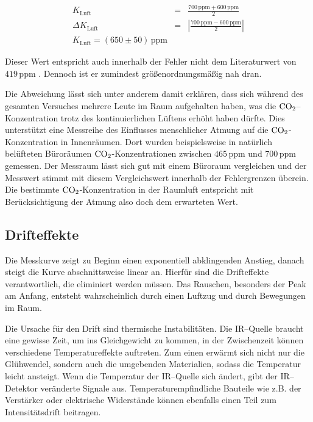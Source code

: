 \documentclass[12pt,a4paper]{scrartcl}
\numberwithin{equation}{section} %
\begin{document}
\begin{eqnarray}
  K_\mathrm{Luft} &=& \frac{700 \mathrm{\, ppm} + 600 \mathrm{\, ppm}}{2} \\
  \Delta K_\mathrm{Luft} &=& \left|\frac{700 \mathrm{\, ppm} - 600 \mathrm{\, ppm}}{2}\right| \\
  K_\mathrm{Luft} = (650 \pm 50) \mathrm{\, ppm}
\end{eqnarray}

Dieser Wert entspricht auch innerhalb der Fehler nicht dem Literaturwert von $419 \mathrm{\, ppm}$ \cite{Kohlendioxid Anteil}. Dennoch ist er zumindest größenordnungsmäßig nah dran.

Die Abweichung lässt sich unter anderem damit erklären, dass sich während des gesamten Versuches mehrere Leute im Raum aufgehalten haben, was die $\ce{CO_2}$--Konzentration trotz des kontinuierlichen Lüftens erhöht haben dürfte. Dies unterstützt eine Messreihe des Einflusses menschlicher Atmung auf die $\ce{CO_2}$-Konzentration in Innenräumen. \cite{Kohlendioxid Innenraum} Dort wurden beispielsweise in natürlich belüfteten Büroräumen $\ce{CO_2}$-Konzentrationen zwischen $465 \mathrm{\, ppm}$ und $700 \mathrm{\, ppm}$ gemessen. Der Messraum lässt sich gut mit einem Büroraum vergleichen und der Messwert stimmt mit diesem Vergleichswert innerhalb der Fehlergrenzen überein. Die bestimmte $\ce{CO_2}$-Konzentration in der Raumluft entspricht mit Berücksichtigung der Atmung also doch dem erwarteten Wert.

\subsection{Drifteffekte}
\label{Drifteffekte}

Die Messkurve zeigt zu Beginn einen exponentiell abklingenden Anstieg, danach steigt die Kurve abschnittsweise linear an. Hierfür sind die Drifteffekte verantwortlich, die eliminiert werden müssen. Das Rauschen, besonders der Peak am Anfang, entsteht wahrscheinlich durch einen Luftzug und durch Bewegungen im Raum.

Die Ursache für den Drift sind thermische Instabilitäten. Die IR--Quelle braucht eine gewisse Zeit, um ins Gleichgewicht zu kommen, in der Zwischenzeit können verschiedene Temperatureffekte auftreten. Zum einen erwärmt sich nicht nur die Glühwendel, sondern auch die umgebenden Materialien, sodass die Temperatur leicht ansteigt. Wenn die Temperatur der IR--Quelle sich ändert, gibt der IR--Detektor veränderte Signale aus. Temperaturempfindliche Bauteile wie z.B. der Verstärker oder elektrische Widerstände können ebenfalls einen Teil zum Intensitätsdrift beitragen.
\end{document}
